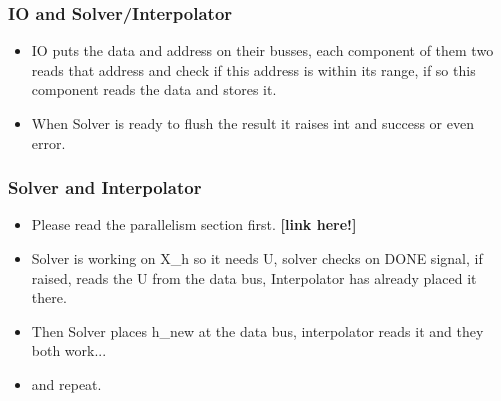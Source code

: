 \documentclass[12pt]{extarticle}
\begin{document}
\subsubsection{IO and Solver/Interpolator}
\begin{itemize}
    \item IO puts the data and address on their busses, each component of them two reads that address and check if this address is within its range, if so this component reads the data and stores it.
    \item When Solver is ready to flush the result it raises int and success or even error.
\end{itemize}

\subsubsection{Solver and Interpolator}
\begin{itemize}
    \item Please read the parallelism section first. \textbf{[link here!]}
    \item Solver is working on X\_h so it needs U, solver checks on DONE signal, if raised, reads the U from the data bus, Interpolator has already placed it there.
    \item Then Solver places h\_new at the data bus, interpolator reads it and they both work...
    \item and repeat.
\end{itemize}
\end{document}
